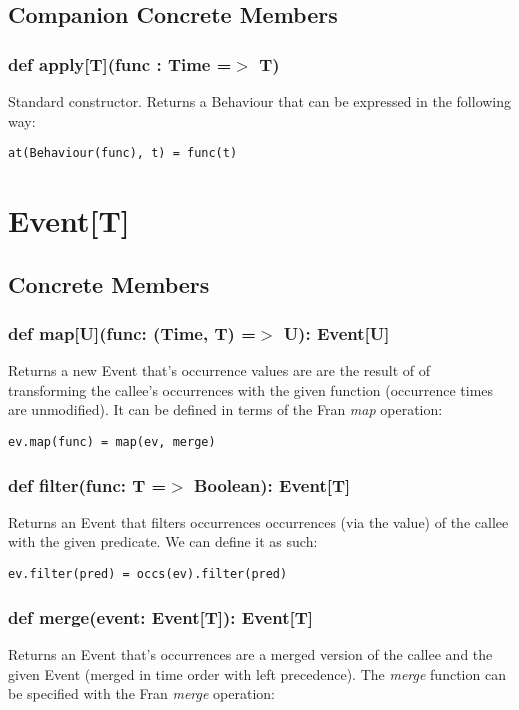     \subsection*{Companion Concrete Members}
    \subsubsection*{def apply[T](func : Time =$>$ T)}
      Standard constructor. Returns a Behaviour
      that can be expressed in the following way:

\begin{verbatim}
at(Behaviour(func), t) = func(t)
\end{verbatim}
      
  \section*{Event[T]}
    \subsection*{Concrete Members}
    \subsubsection*{def map[U](func: (Time, T) =$>$ U): Event[U]}
      Returns a new Event that's occurrence values
      are are the result of of transforming the
      callee's occurrences with the given function (occurrence
      times are unmodified). It can be defined in terms of 
      the Fran \emph{map} operation:

\begin{verbatim}
ev.map(func) = map(ev, merge)
\end{verbatim}      
    
    \subsubsection*{def filter(func: T =$>$ Boolean): Event[T]}
      Returns an Event that filters occurrences
      occurrences (via the value) of the callee
      with the given predicate. We can define it as such:

\begin{verbatim}
ev.filter(pred) = occs(ev).filter(pred)
\end{verbatim}
      
    \subsubsection*{def merge(event: Event[T]): Event[T]}
      Returns an Event that's occurrences
      are a merged version of the callee
      and the given Event (merged in time order
      with left precedence). The \emph{merge}
      function can be specified with the Fran \emph{merge}
      operation:

